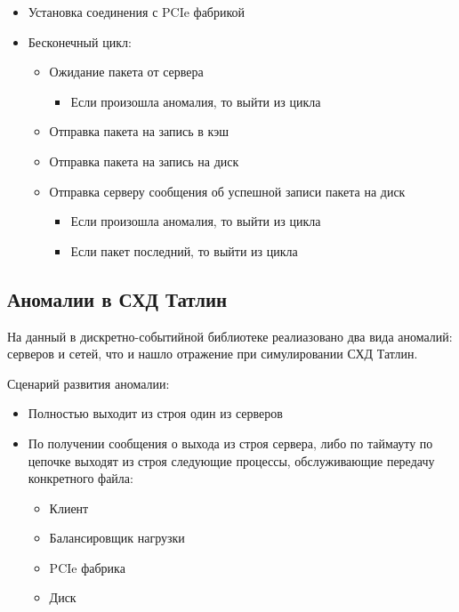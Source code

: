 \begin{itemize}
\item Установка соединения с PCIe фабрикой
\item Бесконечный цикл:
	\begin{itemize}
		\item Ожидание пакета от сервера
		\begin{itemize}
			\item Если произошла аномалия, то выйти из цикла
		\end{itemize}
		
		\item Отправка пакета на запись в кэш
		\item Отправка пакета на запись на диск		
		\item  Отправка серверу сообщения об успешной записи пакета на диск 
		\begin{itemize}
			\item Если произошла аномалия, то выйти из цикла
		\end{itemize}
		\begin{itemize}
			\item Если пакет последний, то выйти из цикла
		\end{itemize}
	\end{itemize}
\end{itemize}

\subsection{Аномалии в СХД Татлин}
На данный в дискретно-событийной библиотеке реалиазовано два вида аномалий: серверов и сетей, что и нашло отражение при симулировании СХД Татлин.

Сценарий развития аномалии:

\begin{itemize}
\item Полностью выходит из строя один из серверов 
\item По получении сообщения о выхода из строя сервера, либо по таймауту по цепочке выходят из строя следующие процессы, обслуживающие передачу конкретного файла:
	\begin{itemize}
		\item  Клиент
		\item Балансировщик нагрузки
		\item PCIe фабрика
		\item Диск
	\end{itemize}
\end{itemize}

